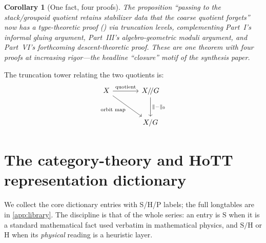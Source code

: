 \documentclass[12pt]{article}
\newtheorem{corollary}[theorem]{Corollary}
\theoremstyle{definition}
\theoremstyle{remark}
\begin{document}
\begin{corollary}[One fact, four proofs]
\label{cor:four-proofs}
The proposition ``passing to the stack/groupoid quotient retains stabilizer data
that the coarse quotient forgets'' now has a type-theoretic proof
() via truncation levels, complementing Part~I's informal
gluing argument, Part~III's algebro-geometric moduli argument, and Part~VI's
forthcoming descent-theoretic proof. These are one theorem with four proofs at
increasing rigor---the headline ``closure'' motif of the synthesis paper.
\end{corollary}

The truncation tower relating the two quotients is:
\begin{equation}
\label{eq:trunc-cd}
\begin{tikzcd}[column sep=large, row sep=large]
X \arrow[r, "\text{quotient}"] \arrow[dr, "\text{orbit map}"'] & X/\!/G \arrow[d, "\lVert-\rVert_0"] \\
& X/G
\end{tikzcd}
\end{equation}

\section{The category-theory and HoTT representation dictionary}
\label{sec:dictionary}

We collect the core dictionary entries with S/H/P labels; the full longtables are
in \cref{app:library}. The discipline is that of the whole series: an entry is
$\mathrm{S}$ when it is a standard mathematical fact used verbatim in
mathematical physics, and $\mathrm{S/H}$ or $\mathrm{H}$ when its \emph{physical}
reading is a heuristic layer.
\end{document}
